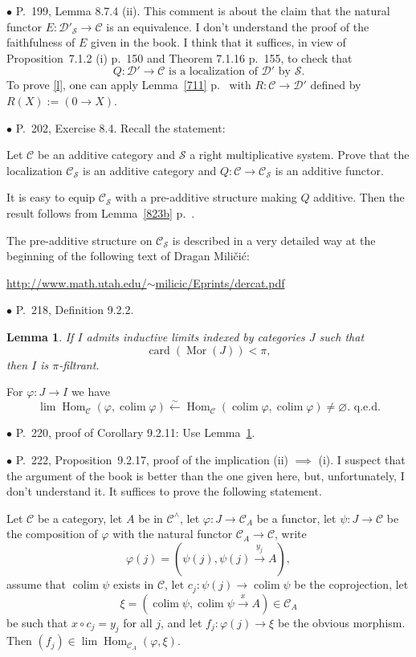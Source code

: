 \documentclass[12pt]{article}
\newtheorem{lem}[thm]{Lemma}
\theoremstyle{remark}
\newcommand{\bu}{\bullet}
\newcommand{\n}{\noindent}
\newcommand{\cc}{\mathcal}
\newcommand{\C}{\mathcal C}
\newcommand{\p}{\varphi}
\newcommand{\xr}{\xrightarrow}
\newcommand{\be}{\begin{equation}}
\newcommand{\ee}{\end{equation}}
\newcommand{\pr}{Proposition}
\DeclareMathOperator*{\co}{colim}
\DeclareMathOperator{\h}{Hom}
\DeclareMathOperator{\Mor}{Mor}
\begin{document}

\n$\bu$ P.~199, Lemma 8.7.4 (ii). This comment is about the claim that the natural functor $E:\cc D'_{\cc S}\to\C$ is an equivalence. I don't understand the proof of the faithfulness of $E$ given in the book. I think that it suffices, in view of \pr\ 7.1.2 (i) p.~150 and Theorem 7.1.16 p.~155, to check that 
%
\be\label{l}
Q:\cc D'\to\C\text{ is a localization of }\cc D'\text{ by }\cc S.
\ee
%
To prove \eqref{l}, one can apply Lemma~\ref{711} p.~\pageref{711} with $R:\C\to\cc D'$ defined by $R(X):=(0\to X)$. 


\n$\bu$ P.~202, Exercise 8.4. Recall the statement: 

Let $\C$ be an additive category and $\cc S$ a right multiplicative system. Prove that the localization $\C_{\cc S}$ is an additive category and $Q:\C\to\C_{\cc S}$ is an additive functor. 

It is easy to equip $\C_{\cc S}$ with a pre-additive structure making $Q$ additive. Then the result follows from Lemma~\ref{823b} p.~\pageref{823b}. 

The pre-additive structure on $\C_{\cc S}$ is described in a very detailed way at the beginning of the following text of Dragan Mili\v{c}i\'c:\bigskip 

\centerline{\href{http://www.math.utah.edu/~milicic/Eprints/dercat.pdf}{http://www.math.utah.edu/$\sim$milicic/Eprints/dercat.pdf}}\bigskip 


\n$\bu$ P.~218, Definition 9.2.2. 
%
\begin{lem}\label{922}
If $I$ admits inductive limits indexed by categories $J$ such that 
$$
\operatorname{card}(\Mor(J))<\pi,
$$ 
then $I$ is $\pi$-filtrant. 
\end{lem}
%
\n{\em Proof.} For $\p:J\to I$ we have
$$
\lim\h_\C(\p,\co\p)\xleftarrow\sim\h_\C(\co\p,\co\p)\neq\varnothing.\text{ q.e.d.}
$$ 


\n$\bu$ P.~220, proof of Corollary 9.2.11: Use Lemma~\ref{922}.


\n$\bu$ P.~222, \pr\ 9.2.17, proof of the implication (ii) $\implies$ (i). I suspect that the argument of the book is better than the one given here, but, unfortunately, I don't understand it. It suffices to prove the following statement. 

Let $\C$ be a category, let $A$ be in $\C^\wedge$, let $\p:J\to\C_A$ be a functor, let $\psi:J\to\C$ be the composition of $\p$ with the natural functor $\C_A\to\C$, write 
$$
\p(j)=(\psi(j),\psi(j)\xr{y_j}A),
$$ 
assume that $\co\psi$ exists in $\C$, let $c_j:\psi(j)\to\co\psi$ be the coprojection, let 
$$
\xi=(\co\psi,\co\psi\xr x A)\in\C_A
$$ 
be such that $x\circ c_j=y_j$ for all $j$, and let $f_j:\p(j)\to\xi$ be the obvious morphism. Then $(f_j)\in\lim\h_{\C_A}(\p,\xi)$. 
\end{document}
